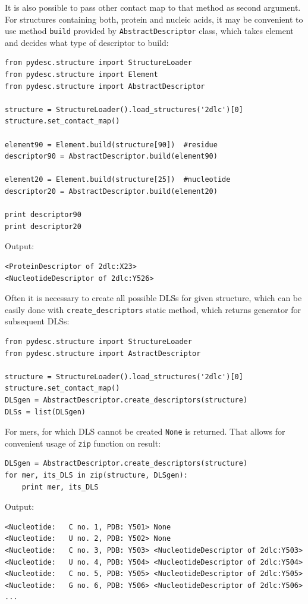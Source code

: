 \documentclass{article}
\begin{document}
It is also possible to pass other contact map to that method as second argument. For structures containing both, protein and nucleic acids, it may be convenient to use method \texttt{build} provided by \texttt{AbstractDescriptor} class, which takes element and decides what type of descriptor to build:

\begin{lstlisting}
from pydesc.structure import StructureLoader
from pydesc.structure import Element
from pydesc.structure import AbstractDescriptor

structure = StructureLoader().load_structures('2dlc')[0]
structure.set_contact_map()

element90 = Element.build(structure[90])  #residue
descriptor90 = AbstractDescriptor.build(element90)

element20 = Element.build(structure[25])  #nucleotide
descriptor20 = AbstractDescriptor.build(element20)

print descriptor90
print descriptor20
\end{lstlisting}
Output:
\begin{lstlisting}
<ProteinDescriptor of 2dlc:X23>
<NucleotideDescriptor of 2dlc:Y526>
\end{lstlisting}

Often it is necessary to create all possible DLSs for given structure, which can be easily done with \texttt{create\_{}descriptors} static method, which returns generator for subsequent DLSs:

\begin{lstlisting}
from pydesc.structure import StructureLoader
from pydesc.structure import AstractDescriptor

structure = StructureLoader().load_structures('2dlc')[0]
structure.set_contact_map()
DLSgen = AbstractDescriptor.create_descriptors(structure)
DLSs = list(DLSgen)
\end{lstlisting}

For mers, for which DLS cannot be created \texttt{None} is returned. That allows for convenient usage of \texttt{zip} function on result:

\begin{lstlisting}
DLSgen = AbstractDescriptor.create_descriptors(structure)
for mer, its_DLS in zip(structure, DLSgen):
    print mer, its_DLS
\end{lstlisting}
Output:
\begin{lstlisting}
<Nucleotide:   C no. 1, PDB: Y501> None
<Nucleotide:   U no. 2, PDB: Y502> None
<Nucleotide:   C no. 3, PDB: Y503> <NucleotideDescriptor of 2dlc:Y503>
<Nucleotide:   U no. 4, PDB: Y504> <NucleotideDescriptor of 2dlc:Y504>
<Nucleotide:   C no. 5, PDB: Y505> <NucleotideDescriptor of 2dlc:Y505>
<Nucleotide:   G no. 6, PDB: Y506> <NucleotideDescriptor of 2dlc:Y506>
...
\end{lstlisting}
\end{document}

